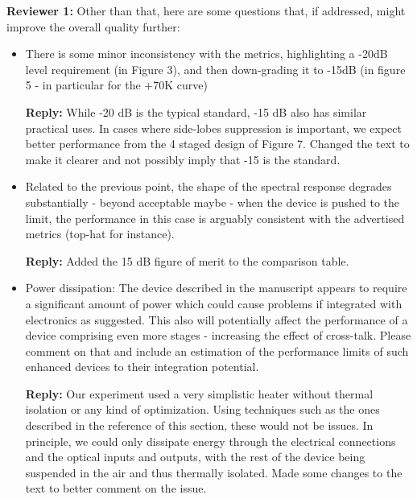 \documentclass[]{letter}
\begin{document}
\textbf{Reviewer 1:} Other than that, here are some questions that, if addressed, might improve the overall quality further:
\begin{itemize}
\item There is some minor inconsistency with the metrics, highlighting a -20dB level requirement (in Figure 3), and then down-grading it to -15dB (in figure 5 - in particular for the +70K curve)

\textbf{Reply:} While -20 dB is the typical standard, -15 dB also has similar practical uses. In cases where side-lobes suppression is important, we expect better performance from the 4 staged design of Figure 7. Changed the text to make it clearer and not possibly imply that -15 is the standard.

\item Related to the previous point, the shape of the spectral response degrades substantially - beyond acceptable maybe - when the device is pushed to the limit, the performance in this case is arguably consistent with the advertised metrics (top-hat for instance).

\textbf{Reply:} Added the 15 dB figure of merit to the comparison table.

\item Power dissipation: The device described in the manuscript appears to require a significant amount of power which could cause problems if integrated with electronics as suggested. This also will potentially affect the performance of a device comprising even more stages - increasing the effect of cross-talk. Please comment on that and include an estimation of the performance limits of such enhanced devices to their integration potential.

\textbf{Reply:} Our experiment used a very simplistic heater without thermal isolation or any kind of optimization. Using techniques such as the ones described in the reference of this section, these would not be issues. In principle, we could only dissipate energy through the electrical connections and the optical inputs and outputs, with the rest of the device being suspended in the air and thus thermally isolated. Made some changes to the text to better comment on the issue.

\end{itemize}
\end{document}
